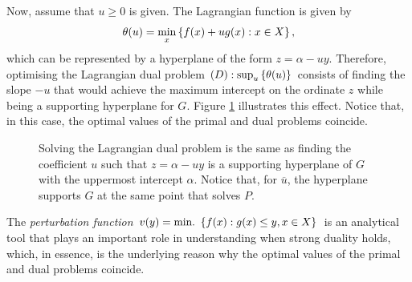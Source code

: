 Now, assume that $u \geq 0$ is given. The Lagrangian function is given by 
$$
\theta(u) = \min_x \left\{ f(x) + ug(x) : x \in X \right \}, 
$$ which can be represented by a hyperplane of the form $z = \alpha - uy$. Therefore, optimising the Lagrangian dual problem $(D) : \sup_u \left\{ \theta(u) \right \}$ consists of finding the slope $-u$ that would achieve the maximum intercept on the ordinate $z$ while being a supporting hyperplane for $G$. Figure \ref{fig:convex_G} illustrates this effect. Notice that, in this case, the optimal values of the primal and dual problems coincide.
%
\begin{figure}
		\caption{Solving the Lagrangian dual problem is the same as finding the coefficient $u$ such that $z = \alpha - uy$ is a supporting hyperplane of $G$ with the uppermost intercept $\alpha$. Notice that, for $\overline{u}$, the hyperplane supports $G$ at the same point that solves $P$.}\label{fig:convex_G}
	\end{figure}
%
The \emph{perturbation function} $v(y) = \mathop{\text{min.~}}\left\{ f(x) : g(x) \leq y, x \in X \right \}$ is an analytical tool that plays an important role in understanding when strong duality holds, which, in essence, is the underlying reason why the optimal values of the primal and dual problems coincide. 

